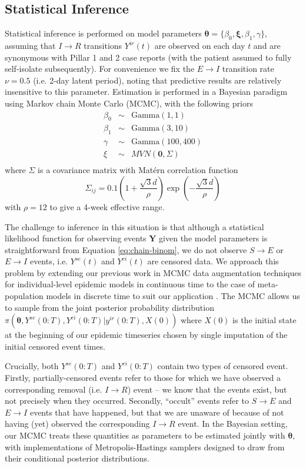 \documentclass[a4paper]{article}
\begin{document}
\begin{appendices}
\section{Statistical Inference}\label{app:inference}
Statistical inference is performed on model parameters $\bm{\theta} = \{ \beta_0, \bm{\xi},
\beta_1, \gamma\}$, assuming that $I\rightarrow R$ transitions $Y^{ir}(t)$ are observed on
each day $t$ and are synonymous with Pillar 1 and 2 case reports (with the patient assumed to fully
self-isolate subsequently).  For convenience we fix the $E\rightarrow I$ transition rate
$\nu = 0.5$ (i.e. 2-day latent period), noting that predictive results are relatively
insensitive to this parameter.  Estimation is performed in a Bayesian paradigm using
Markov chain Monte Carlo (MCMC), with the following priors
\begin{eqnarray*}
\beta_0 & \sim & \mbox{Gamma}(1, 1)     \\
\beta_1 & \sim & \mbox{Gamma}(3, 10)    \\
\gamma  & \sim & \mbox{Gamma}(100, 400) \\
\xi     & \sim & MVN(\bm{0}, \Sigma)    \\  
\end{eqnarray*}
where $\Sigma$ is a covariance matrix with Mat\'ern correlation function
$$\Sigma_{ij} = 0.1 \left( 1 + \frac{\sqrt{3}d}{\rho} \right) \exp
\left(-\frac{\sqrt{3}d}{\rho} \right)
$$
with $\rho = 12$ to give a 4-week effective range.


The challenge to inference in this situation is that although
a statistical likelihood function for observing events $\bm{Y}$ given the model parameters
is straightforward from Equation \ref{eq:chain-binom}, we do not observe $S\rightarrow E$
or $E\rightarrow I$ events, i.e.  $Y^{se}(t)$ and $Y^{ei}(t)$ are censored data.  We approach
this problem by extending our previous work in MCMC data augmentation
techniques for individual-level epidemic models in continuous time to the case of
meta-population models in discrete time to suit our application \citep{JewEtAl2009a,
  JewEtAl2009b}.  The MCMC allows us to sample from the joint posterior probability distribution
$\pi(\bm{\theta}, Y^{se}(0{:}T), Y^{ei}(0{:}T) | y^{ir}(0{:}T), X(0))$ where $X(0)$ is the initial
state at the beginning of our epidemic timeseries chosen by single imputation of the initial censored
event times.

Crucially, both $Y^{se}(0{:}T)$ and $Y^{ei}(0{:}T)$ contain two types of
censored event.  Firstly, partially-censored events refer to those for which we have
observed a corresponding removal (i.e. $I\rightarrow R$) event -- we know that the events
exist, but not precisely when they occurred.  Secondly, ``occult'' events refer to
$S\rightarrow E$ and $E\rightarrow I$ events that have happened, but that we are unaware
of because of not having (yet) observed the corresponding $I\rightarrow R$ event.  In the
Bayesian setting, our MCMC treats these quantities as parameters to be estimated jointly
with $\bm{\theta}$, with implementations of Metropolis-Hastings samplers designed to draw
from their conditional posterior distributions.


\end{appendices}
\end{document}
